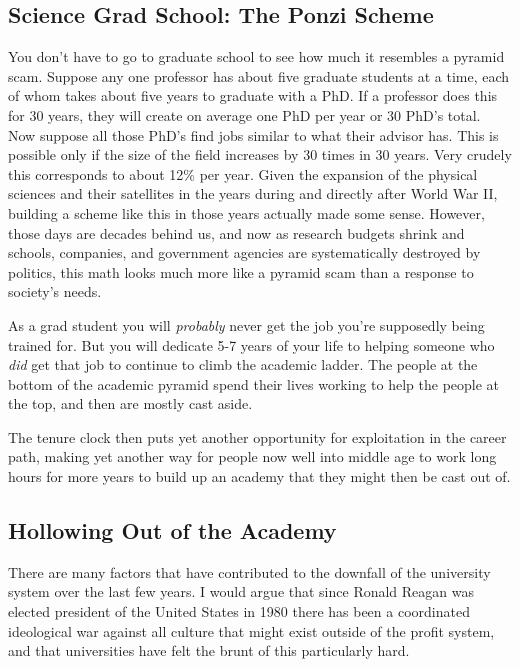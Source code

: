 \subsection{Science Grad School: The Ponzi
Scheme}\label{science-grad-school-the-ponzi-scheme}

You don't have to go to graduate school to see how much it resembles a
pyramid scam. Suppose any one professor has about five graduate students
at a time, each of whom takes about five years to graduate with a PhD.
If a professor does this for 30 years, they will create on average one
PhD per year or 30 PhD's total. Now suppose all those PhD's find jobs
similar to what their advisor has. This is possible only if the size of
the field increases by 30 times in 30 years. Very crudely this
corresponds to about 12\% per year. Given the expansion of the physical
sciences and their satellites in the years during and directly after
World War II, building a scheme like this in those years actually made
some sense. However, those days are decades behind us, and now as
research budgets shrink and schools, companies, and government agencies
are systematically destroyed by politics, this math looks much more like
a pyramid scam than a response to society's needs.

As a grad student you will \emph{probably} never get the job you're
supposedly being trained for. But you will dedicate 5-7 years of your
life to helping someone who \emph{did} get that job to continue to climb
the academic ladder. The people at the bottom of the academic pyramid
spend their lives working to help the people at the top, and then are
mostly cast aside.

The tenure clock then puts yet another opportunity for exploitation in
the career path, making yet another way for people now well into middle
age to work long hours for more years to build up an academy that they
might then be cast out of.

\subsection{Hollowing Out of the
Academy}\label{hollowing-out-of-the-academy}

There are many factors that have contributed to the downfall of the
university system over the last few years. I would argue that since
Ronald Reagan was elected president of the United States in 1980 there
has been a coordinated ideological war against all culture that might
exist outside of the profit system, and that universities have felt the
brunt of this particularly hard.

